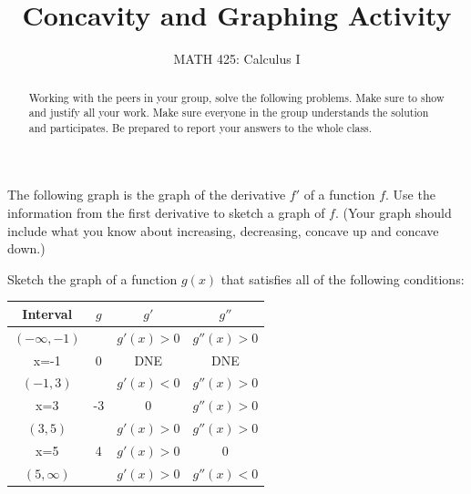 \documentclass{ximera}
\title{Concavity and Graphing Activity}
\author{MATH 425: Calculus I}
\begin{document}
\begin{abstract}
   Working with the peers in your group, solve the following problems. Make sure to show and justify all your work. Make sure everyone in the group understands the solution and participates. Be prepared to report your answers to the whole class. 
\end{abstract}
\maketitle


\begin{exercise}
    The following graph is the graph of the derivative $f'$ of a function $f$.  Use the information from the first derivative to sketch a graph of $f$. (Your graph should include what you know about increasing, decreasing, concave up and concave down.)\\
    \begin{image} 
    \end{image}
\end{exercise}

\begin{exercise}
    Sketch the graph of a function $g(x)$ that satisfies all of the following conditions: \\
    \begin{tabular}{c|c|c|c}
       Interval  & $g$ & $g'$ & $g''$  \\ \hline
        $(-\infty, -1)$ &  & $g'(x)>0$ & $g''(x)>0$\\
        x=-1 & 0 & DNE & DNE \\
        $(-1, 3)$ & & $g'(x)<0$ & $g''(x)>0$\\
        x=3 & -3 & 0 & $g''(x)>0$\\
        $(3,5)$ & & $g'(x)>0$ & $g''(x)>0$\\
        x=5 & 4 & $g'(x)>0 $& 0\\
        $(5,\infty)$ & & $g'(x)>0$ & $g''(x)<0$
    \end{tabular}
\end{exercise}
\end{document}
